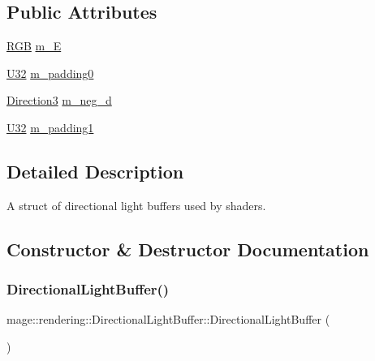 \subsection*{Public Attributes}
\begin{DoxyCompactItemize}
\item 
\hyperlink{structmage_1_1_r_g_b}{R\+GB} \hyperlink{structmage_1_1rendering_1_1_directional_light_buffer_aeaaec31da683b9ef189e775511db637a}{m\+\_\+E}
\item 
\hyperlink{namespacemage_a41c104c036fba3756a74e19f793eeaa1}{U32} \hyperlink{structmage_1_1rendering_1_1_directional_light_buffer_a82d9a78edf5562c3ce041d1a2a7b6a3e}{m\+\_\+padding0}
\item 
\hyperlink{structmage_1_1_direction3}{Direction3} \hyperlink{structmage_1_1rendering_1_1_directional_light_buffer_acbf55b6ed38011a695cb1feac90a64ed}{m\+\_\+neg\+\_\+d}
\item 
\hyperlink{namespacemage_a41c104c036fba3756a74e19f793eeaa1}{U32} \hyperlink{structmage_1_1rendering_1_1_directional_light_buffer_a9e86dcc4f68340eb64408cf638996a69}{m\+\_\+padding1}
\end{DoxyCompactItemize}


\subsection{Detailed Description}
A struct of directional light buffers used by shaders. 

\subsection{Constructor \& Destructor Documentation}
\hypertarget{structmage_1_1rendering_1_1_directional_light_buffer_a618dbd63423f0f008ef18c5e5a7fe560}{}\label{structmage_1_1rendering_1_1_directional_light_buffer_a618dbd63423f0f008ef18c5e5a7fe560} 
\subsubsection{\texorpdfstring{Directional\+Light\+Buffer()}{DirectionalLightBuffer()}\hspace{0.1cm}{\footnotesize\ttfamily [1/3]}}
{\footnotesize\ttfamily mage\+::rendering\+::\+Directional\+Light\+Buffer\+::\+Directional\+Light\+Buffer (\begin{DoxyParamCaption}{ }\end{DoxyParamCaption})\hspace{0.3cm}{\ttfamily [noexcept]}}

